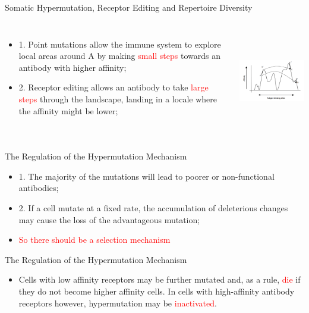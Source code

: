 \begin{frame}{Somatic Hypermutation, Receptor Editing and Repertoire Diversity}
\begin{columns}[c] 
\begin{itemize}
\item{1. Point mutations allow the immune system to explore local areas around A by making \textcolor{red}{small steps} towards an antibody with higher affinity;}
\item{2. Receptor editing allows an antibody to take \textcolor{red}{large steps} through the landscape, landing in a locale where the affinity might be lower;}
\end{itemize}
\includegraphics[height=4.5cm]{img/cj_somatic_muta.png}
\end{columns}
\end{frame}

\begin{frame}{The Regulation of the Hypermutation Mechanism}
\begin{itemize}
\item{1. The majority of the mutations  will lead to poorer or non-functional antibodies;}
\item{2. If a cell mutate at a fixed rate, the accumulation of deleterious changes may cause the loss of the advantageous mutation;}
\item{\textcolor{red}{So there should be a selection mechanism}}
\end{itemize}
\end{frame}


\begin{frame}{The Regulation of the Hypermutation Mechanism}
\begin{itemize}
\item{Cells with low affinity receptors may be further mutated and, as a rule, \textcolor{red}{die} if they do not become higher affinity cells. In cells with high-affinity antibody receptors however, hypermutation may be \textcolor{red}{inactivated}.}
\end{itemize}
\end{frame}

